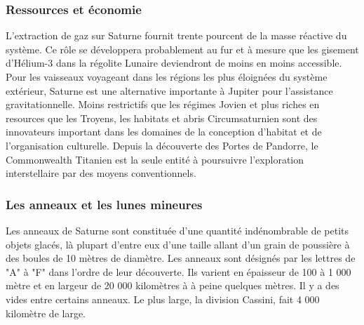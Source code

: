 \subsubsection{Ressources et économie} \label{sec:saturn-resources-economics} 

L'extraction de gaz sur Saturne fournit trente pourcent de la masse réactive du système. Ce rôle se développera probablement au fur et à mesure que les gisement d'Hélium-3 dans la régolite Lunaire deviendront de moins en moins accessible. Pour les vaisseaux voyageant dans les régions les plus éloignées du système extérieur, Saturne est une alternative importante à Jupiter pour l'assistance gravitationnelle. Moins restrictifs que les régimes Jovien et plus riches en resources que les Troyens, les habitats et abris Circumsaturnien sont des innovateurs important dans les domaines de la conception d'habitat et de l'organisation culturelle. Depuis la découverte des Portes de Pandorre, le Commonwealth Titanien est la seule entité à poursuivre l'exploration interstellaire par des moyens conventionnels. 

\subsubsection{Les anneaux et les lunes mineures} \label{sec:rings-class-minor} 

Les anneaux de Saturne sont constituée d'une quantité indénombrable de petits objets glacés, là plupart d'entre eux d'une taille allant d'un grain de poussière à des boules de 10 mètres de diamètre. Les anneaux sont désignés par les lettres de "A" à "F" dans l'ordre de leur découverte. Ils varient en épaisseur de 100 à 1 000 mètre et en largeur de 20 000 kilomètres à à peine quelques mètres. Il y a des vides entre certains anneaux. Le plus large, la division Cassini, fait 4 000 kilomètre de large. 





